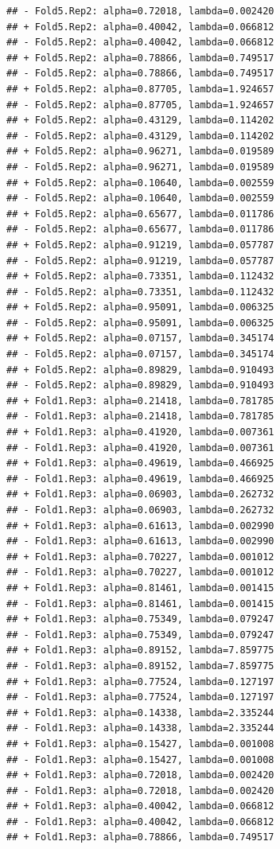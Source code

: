 \documentclass[
]{article}
\begin{document}
\begin{verbatim}
## - Fold5.Rep2: alpha=0.72018, lambda=0.002420 
## + Fold5.Rep2: alpha=0.40042, lambda=0.066812 
## - Fold5.Rep2: alpha=0.40042, lambda=0.066812 
## + Fold5.Rep2: alpha=0.78866, lambda=0.749517 
## - Fold5.Rep2: alpha=0.78866, lambda=0.749517 
## + Fold5.Rep2: alpha=0.87705, lambda=1.924657 
## - Fold5.Rep2: alpha=0.87705, lambda=1.924657 
## + Fold5.Rep2: alpha=0.43129, lambda=0.114202 
## - Fold5.Rep2: alpha=0.43129, lambda=0.114202 
## + Fold5.Rep2: alpha=0.96271, lambda=0.019589 
## - Fold5.Rep2: alpha=0.96271, lambda=0.019589 
## + Fold5.Rep2: alpha=0.10640, lambda=0.002559 
## - Fold5.Rep2: alpha=0.10640, lambda=0.002559 
## + Fold5.Rep2: alpha=0.65677, lambda=0.011786 
## - Fold5.Rep2: alpha=0.65677, lambda=0.011786 
## + Fold5.Rep2: alpha=0.91219, lambda=0.057787 
## - Fold5.Rep2: alpha=0.91219, lambda=0.057787 
## + Fold5.Rep2: alpha=0.73351, lambda=0.112432 
## - Fold5.Rep2: alpha=0.73351, lambda=0.112432 
## + Fold5.Rep2: alpha=0.95091, lambda=0.006325 
## - Fold5.Rep2: alpha=0.95091, lambda=0.006325 
## + Fold5.Rep2: alpha=0.07157, lambda=0.345174 
## - Fold5.Rep2: alpha=0.07157, lambda=0.345174 
## + Fold5.Rep2: alpha=0.89829, lambda=0.910493 
## - Fold5.Rep2: alpha=0.89829, lambda=0.910493 
## + Fold1.Rep3: alpha=0.21418, lambda=0.781785 
## - Fold1.Rep3: alpha=0.21418, lambda=0.781785 
## + Fold1.Rep3: alpha=0.41920, lambda=0.007361 
## - Fold1.Rep3: alpha=0.41920, lambda=0.007361 
## + Fold1.Rep3: alpha=0.49619, lambda=0.466925 
## - Fold1.Rep3: alpha=0.49619, lambda=0.466925 
## + Fold1.Rep3: alpha=0.06903, lambda=0.262732 
## - Fold1.Rep3: alpha=0.06903, lambda=0.262732 
## + Fold1.Rep3: alpha=0.61613, lambda=0.002990 
## - Fold1.Rep3: alpha=0.61613, lambda=0.002990 
## + Fold1.Rep3: alpha=0.70227, lambda=0.001012 
## - Fold1.Rep3: alpha=0.70227, lambda=0.001012 
## + Fold1.Rep3: alpha=0.81461, lambda=0.001415 
## - Fold1.Rep3: alpha=0.81461, lambda=0.001415 
## + Fold1.Rep3: alpha=0.75349, lambda=0.079247 
## - Fold1.Rep3: alpha=0.75349, lambda=0.079247 
## + Fold1.Rep3: alpha=0.89152, lambda=7.859775 
## - Fold1.Rep3: alpha=0.89152, lambda=7.859775 
## + Fold1.Rep3: alpha=0.77524, lambda=0.127197 
## - Fold1.Rep3: alpha=0.77524, lambda=0.127197 
## + Fold1.Rep3: alpha=0.14338, lambda=2.335244 
## - Fold1.Rep3: alpha=0.14338, lambda=2.335244 
## + Fold1.Rep3: alpha=0.15427, lambda=0.001008 
## - Fold1.Rep3: alpha=0.15427, lambda=0.001008 
## + Fold1.Rep3: alpha=0.72018, lambda=0.002420 
## - Fold1.Rep3: alpha=0.72018, lambda=0.002420 
## + Fold1.Rep3: alpha=0.40042, lambda=0.066812 
## - Fold1.Rep3: alpha=0.40042, lambda=0.066812 
## + Fold1.Rep3: alpha=0.78866, lambda=0.749517 

\end{verbatim}
\end{document}
